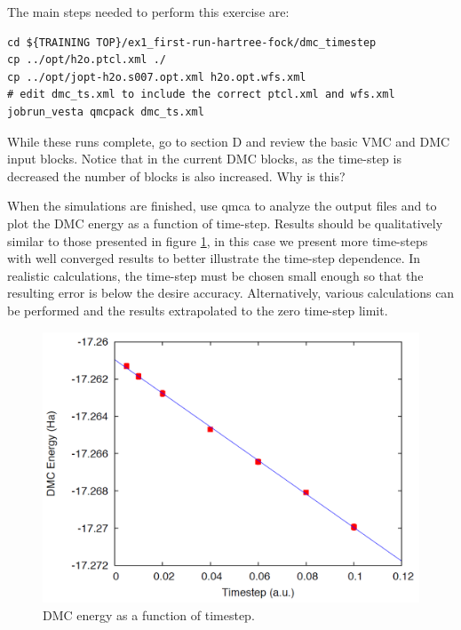 The main steps needed to perform this exercise are:
\begin{shaded}
\begin{verbatim}
cd ${TRAINING TOP}/ex1_first-run-hartree-fock/dmc_timestep
cp ../opt/h2o.ptcl.xml ./
cp ../opt/jopt-h2o.s007.opt.xml h2o.opt.wfs.xml
# edit dmc_ts.xml to include the correct ptcl.xml and wfs.xml
jobrun_vesta qmcpack dmc_ts.xml
\end{verbatim}
\end{shaded}
While these runs complete, go to section D and review the basic VMC and DMC input
blocks. Notice that in the current DMC blocks, as the time-step is decreased the number of blocks is also increased. Why is this?

When the simulations are finished, use qmca to analyze the output files and to plot the
DMC energy as a function of time-step. Results should be qualitatively similar to those
presented in figure \ref{fig:lam_dmc_timestep}, in this case we present more time-steps with well converged results to
better illustrate the time-step dependence. In realistic calculations, the time-step must be
chosen small enough so that the resulting error is below the desire accuracy. Alternatively,
various calculations can be performed and the results extrapolated to the zero time-step
limit.


\begin{figure}
\begin{center}
\includegraphics[trim = 0mm 0mm 0mm 0mm, clip,width=0.75\columnwidth]{./figures/lab_advanced_molecules_dmc_timestep}
\end{center}
\caption{DMC energy as a function of timestep.
\label{fig:lam_dmc_timestep}
}
\end{figure}


